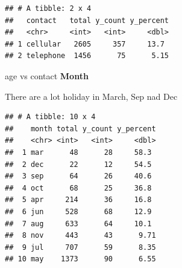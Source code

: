 \documentclass[
]{article}
\newenvironment{Shaded}{\begin{snugshade}}{\end{snugshade}}
\newcommand{\AttributeTok}[1]{\textcolor[rgb]{0.13,0.29,0.53}{#1}}
\newcommand{\ConstantTok}[1]{\textcolor[rgb]{0.56,0.35,0.01}{#1}}
\newcommand{\DecValTok}[1]{\textcolor[rgb]{0.00,0.00,0.81}{#1}}
\newcommand{\FunctionTok}[1]{\textcolor[rgb]{0.13,0.29,0.53}{\textbf{#1}}}
\newcommand{\NormalTok}[1]{#1}
\newcommand{\OtherTok}[1]{\textcolor[rgb]{0.56,0.35,0.01}{#1}}
\newcommand{\SpecialCharTok}[1]{\textcolor[rgb]{0.81,0.36,0.00}{\textbf{#1}}}
\newcommand{\StringTok}[1]{\textcolor[rgb]{0.31,0.60,0.02}{#1}}
\begin{document}
\begin{verbatim}
## # A tibble: 2 x 4
##   contact   total y_count y_percent
##   <chr>     <int>   <int>     <dbl>
## 1 cellular   2605     357     13.7 
## 2 telephone  1456      75      5.15
\end{verbatim}

age vs contact \textbf{Month}

There are a lot holiday in March, Sep nad Dec

\begin{Shaded}
\end{Shaded}

\begin{verbatim}
## # A tibble: 10 x 4
##    month total y_count y_percent
##    <chr> <int>   <int>     <dbl>
##  1 mar      48      28     58.3 
##  2 dec      22      12     54.5 
##  3 sep      64      26     40.6 
##  4 oct      68      25     36.8 
##  5 apr     214      36     16.8 
##  6 jun     528      68     12.9 
##  7 aug     633      64     10.1 
##  8 nov     443      43      9.71
##  9 jul     707      59      8.35
## 10 may    1373      90      6.55
\end{verbatim}
\end{document}

